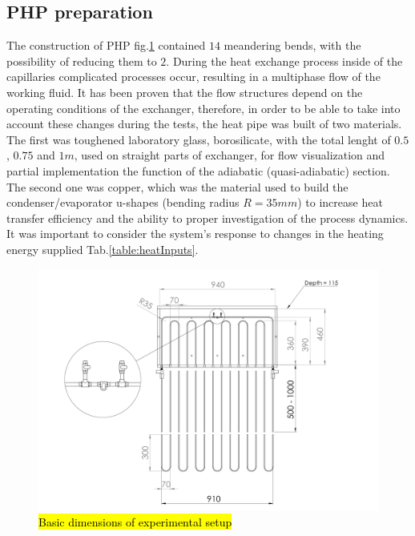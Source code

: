 \documentclass[article]{elsarticle}
\newcommand{\hlc}[2][yellow]{ {\sethlcolor{#1} \hl{#2}} }
\begin{document}
\subsection{PHP preparation} 
The construction of PHP fig.\ref{jdm1} contained $14$ meandering bends, with the possibility of reducing them to $2$. During the heat exchange process inside of the capillaries complicated processes occur, resulting in a multiphase flow of the working fluid. It has been proven that the flow structures depend on the operating conditions of the exchanger, therefore, in order to be able to take into account these changes during the tests, the heat pipe was built of two materials. The first was toughened laboratory glass, borosilicate, with the total lenght of $0.5$, $0.75$ and $1m$, used on straight parts of exchanger, for flow visualization and partial implementation the function of the adiabatic (quasi-adiabatic) section. The second one was copper, which was the material used to build the condenser/evaporator u-shapes (bending radius $R=35mm$) to increase heat transfer efficiency and the ability to proper investigation of the process dynamics. It was important to consider the system's response to changes in the heating energy supplied Tab.\ref{table:heatInputs}.\\
\begin{figure}[H]
\centering
\includegraphics[width=1\textwidth]{figures/Wizualizacja.png}
\caption{\hlc{Basic dimensions of experimental setup}}
\label{jdm1}
\end{figure}
\end{document}
